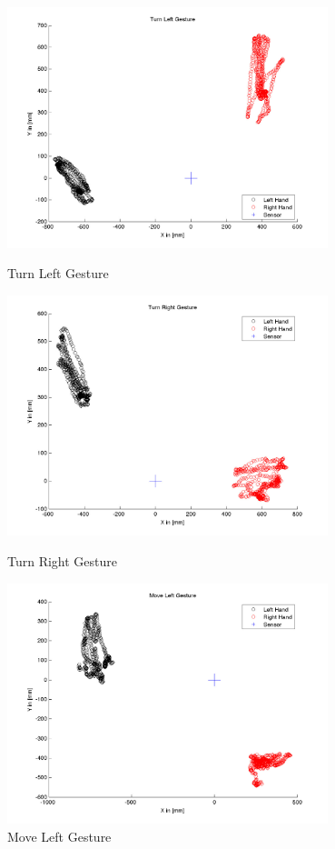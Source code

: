\begin{figure}
	\begin{minipage}
		{.5 
		\textwidth} \hspace{-15 mm} 
		\includegraphics[height=70mm]{figures/result/train-turn-left.jpg} \caption*{Turn Left Gesture} 
	\end{minipage}
	\begin{minipage}
		{.5 
		\textwidth} 
		\includegraphics[height=70mm]{figures/result/train-turn-right.jpg} \caption*{Turn Right Gesture} 
	\end{minipage}
	\begin{minipage}
		{.5 
		\textwidth} \hspace{-15 mm} 
		\includegraphics[height=70mm]{figures/result/train-move-left.jpg} \caption*{Move Left Gesture} 

\end{minipage}
\end{figure}
